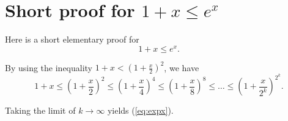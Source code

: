 \documentclass{article}
\begin{document}
\section{Short proof for $1 + x \le e^x$}

Here is a short elementary proof for
\begin{equation}
1 + x \le e^x.
\label{eq:expx}
\end{equation}


By using the inequality $1 + x < \left(1 + \frac{x}{2}\right)^2$, we have
\begin{equation}
1 + x
\le
\left(1 + \frac x 2 \right)^2
\le
\left(1 + \frac x 4 \right)^4
\le
\left(1 + \frac x 8 \right)^8
\le
\dots
\le
\left(1 + \frac x {2^k} \right)^{2^k}.
\end{equation}

Taking the limit of $k \rightarrow \infty$ yields (\ref{eq:expx}).
\end{document}
